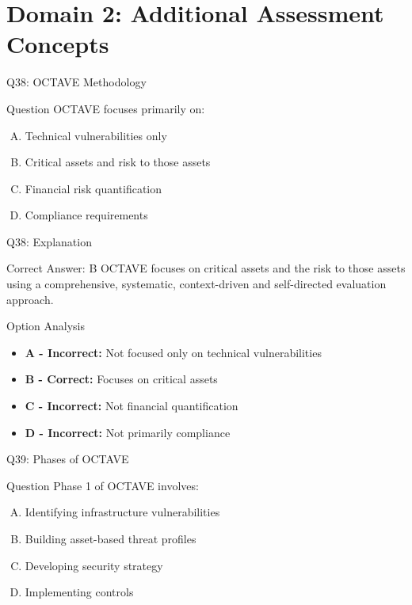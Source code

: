 \documentclass{beamer}
\begin{document}
	
	\section{Domain 2: Additional Assessment Concepts}
	
	\begin{frame}{Q38: OCTAVE Methodology}
		\begin{block}{Question}
			OCTAVE focuses primarily on:
		\end{block}
		\begin{enumerate}[(A)]
			\item Technical vulnerabilities only
			\item Critical assets and risk to those assets
			\item Financial risk quantification
			\item Compliance requirements
		\end{enumerate}
	\end{frame}
	
	\begin{frame}{Q38: Explanation}
		\begin{block}{Correct Answer: B}
			OCTAVE focuses on critical assets and the risk to those assets using a comprehensive, systematic, context-driven and self-directed evaluation approach.
		\end{block}
		\begin{block}{Option Analysis}
			\begin{itemize}
				\item \textbf{A - Incorrect:} Not focused only on technical vulnerabilities
				\item \textbf{B - Correct:} Focuses on critical assets
				\item \textbf{C - Incorrect:} Not financial quantification
				\item \textbf{D - Incorrect:} Not primarily compliance
			\end{itemize}
		\end{block}
	\end{frame}
	
	\begin{frame}{Q39: Phases of OCTAVE}
		\begin{block}{Question}
			Phase 1 of OCTAVE involves:
		\end{block}
		\begin{enumerate}[(A)]
			\item Identifying infrastructure vulnerabilities
			\item Building asset-based threat profiles
			\item Developing security strategy
			\item Implementing controls
		\end{enumerate}
	\end{frame}
	
\end{document}
